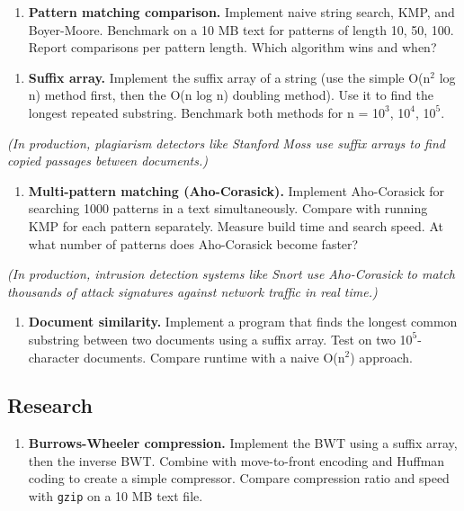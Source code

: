\begin{enumerate}
\item \textbf{Pattern matching comparison.} Implement naive string search, KMP, and Boyer-Moore. Benchmark on a 10 MB text for patterns of length 10, 50, 100. Report comparisons per pattern length. Which algorithm wins and when?
\end{enumerate}

\begin{enumerate}
\item \textbf{Suffix array.} Implement the suffix array of a string (use the simple O(n$^{2}$ log n) method first, then the O(n log n) doubling method). Use it to find the longest repeated substring. Benchmark both methods for n = 1$0^{3}$, 1$0^{4}$, 1$0^{5}$.
\end{enumerate}

   \textit{(In production, plagiarism detectors like Stanford Moss use suffix arrays to find copied passages between documents.)}

\begin{enumerate}
\item \textbf{Multi-pattern matching (Aho-Corasick).} Implement Aho-Corasick for searching 1000 patterns in a text simultaneously. Compare with running KMP for each pattern separately. Measure build time and search speed. At what number of patterns does Aho-Corasick become faster?
\end{enumerate}

   \textit{(In production, intrusion detection systems like Snort use Aho-Corasick to match thousands of attack signatures against network traffic in real time.)}

\begin{enumerate}
\item \textbf{Document similarity.} Implement a program that finds the longest common substring between two documents using a suffix array. Test on two 1$0^{5}$-character documents. Compare runtime with a naive O(n$^{2}$) approach.
\end{enumerate}

\subsection{Research}

\begin{enumerate}
\item \textbf{Burrows-Wheeler compression.} Implement the BWT using a suffix array, then the inverse BWT. Combine with move-to-front encoding and Huffman coding to create a simple compressor. Compare compression ratio and speed with \texttt{gzip} on a 10 MB text file.
\end{enumerate}

